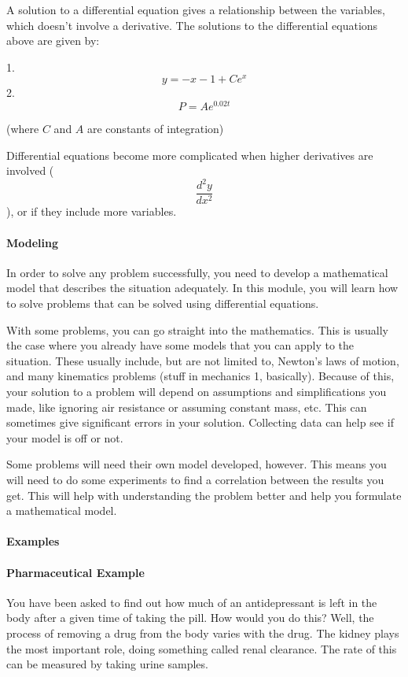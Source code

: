 A solution to a differential equation gives a relationship between the variables, which doesn't involve a derivative. The solutions to the differential equations above are given by:

1. $$y = -x - 1 + Ce^x$$
2. $$P = Ae^{0.02t}$$ 

(where $C$ and $A$ are constants of integration)

Differential equations become more complicated when higher derivatives are involved ($$\frac{d^2y}{dx^2}$$), or if they include more variables.

\paragraph{Modeling}

In order to solve any problem successfully, you need to develop a mathematical model that describes the situation adequately. In this module, you will learn how to solve problems that can be solved using differential equations.

With some problems, you can go straight into the mathematics. This is usually the case where you already have some models that you can apply to the situation. These usually include, but are not limited to, Newton's laws of motion, and many kinematics problems (stuff in mechanics 1, basically). Because of this, your solution to a problem will depend on assumptions and simplifications you made, like ignoring air resistance or assuming constant mass, etc. This can sometimes give significant errors in your solution. Collecting data can help see if your model is off or not.

Some problems will need their own model developed, however. This means you will need to do some experiments to find a correlation between the results you get. This will help with understanding the problem better and help you formulate a mathematical model.

\paragraph{Examples}

\paragraph{Pharmaceutical Example}

You have been asked to find out how much of an antidepressant is left in the body after a given time of taking the pill. How would you do this? Well, the process of removing a drug from the body varies with the drug. The kidney plays the most important role, doing something called renal clearance. The rate of this can be measured by taking urine samples.

